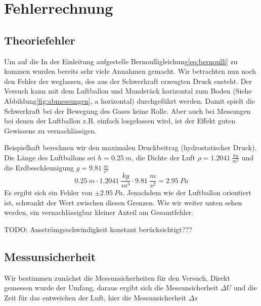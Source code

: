 \documentclass{article}
\begin{document}
    \section{Fehlerrechnung}\label{fehlerrechnung}
        \subsection{Theoriefehler}
            Um auf die In der Einleitung aufgestelle Bernoulligleichung\ref{eq:bernoulli} zu kommen wurden bereits sehr viele Annahmen gemacht.
            Wir betrachten nun noch den Fehler der weglassen, des aus der Schwerkraft erzeugten Druck ensteht.
            Der Versuch kann mit dem Luftballon und Mundstück horizontal zum Boden (Siehe Abbildung\ref{fig:abmessungen}, a horizontal) durchgeführt werden.
            Damit spielt die Schwerkraft bei der Bewegung des Gases keine Rolle. Aber auch bei Messungen bei denen der Luftballon z.B. einfach losgelassen wird,
            ist der Effekt guten Gewissens zu vernachlässigen.

            Beispielhaft berechnen wir den maximalen Druckbeitrag (hydrostatischer Druck\cite{Luftdruck}).
            Die Länge des Luftballons sei \(h = \SI{0.25}{m}\), die Dichte der Luft \(\rho = \SI{1.2041}{\frac{kg}{m^3}} \)\cite{Aufgabenstellung}
            und die Erdbeschleunigung \(g = \SI{9.81}{\frac{m}{s^2}} \)
            \begin{equation}
                \SI{0.25}{m} \cdot \SI{1.2041}{\frac{kg}{m^3}} \cdot \SI{9.81}{\frac{m}{s^2}} = \SI{2.95}{Pa} %
            \end{equation}
            Es ergibt sich ein Fehler von \(\pm \SI{2.95}{Pa}\). Jenachdem wie der Luftballon orientiert ist, schwankt der Wert zwischen diesen Grenzen.
            Wie wir weiter unten sehen werden, ein vernachlässigbar kleiner Anteil am Gesamtfehler.

            TODO: Ausströmgeschwindigkeit konstant berücksichtigt???

        \subsection{Messunsicherheit}
            Wir bestimmen zunächst die Messunsicherheiten für den Versuch.
            Direkt gemessen wurde der Umfang, daraus ergibt sich die Messunsicherheit \(\Delta U\)
            und die Zeit für das entweichen der Luft, hier die Messunsicherheit \(\Delta s\)
\end{document}
